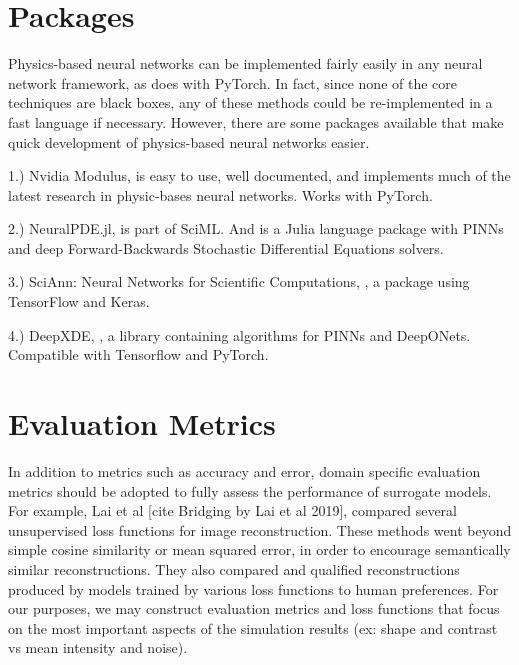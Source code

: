 \documentclass[]{article}
\begin{document}
\section{Packages}
Physics-based neural networks can be implemented fairly easily in any neural network framework, as \cite{pbdl_book} does with PyTorch.  In fact, since none of the core techniques are black boxes, any of these methods could be re-implemented in a fast language if necessary.  However, there are some packages available that make quick development of physics-based neural networks easier. 

1.) Nvidia Modulus, \cite{nvidia_modulus} is easy to use, well documented, and implements much of the latest research in physic-bases neural networks.  Works with PyTorch.

2.) NeuralPDE.jl, \cite{zubov2021neuralpde} is part of SciML.  And is a Julia language package with PINNs and deep Forward-Backwards Stochastic Differential Equations solvers. 

3.) SciAnn: Neural Networks for Scientific Computations, \cite{haghighat2021sciann}, a package using TensorFlow and Keras.

4.) DeepXDE, \cite{lu2021deepxde},  a library containing algorithms for PINNs and DeepONets.  Compatible with Tensorflow and PyTorch.

\section{Evaluation Metrics}
In addition to metrics such as accuracy and error, domain specific evaluation metrics should be adopted to fully assess the performance of surrogate models.  For example, Lai et al [cite Bridging by Lai et al 2019], compared several unsupervised loss functions for image reconstruction.  These methods went beyond simple cosine similarity or mean squared error, in order to encourage semantically similar reconstructions.  They also compared and qualified reconstructions produced by models trained by various loss functions to human preferences.  For our purposes, we may construct evaluation metrics and loss functions that focus on the most important aspects of the simulation results (ex: shape and contrast vs mean intensity and noise). 



\end{document}
